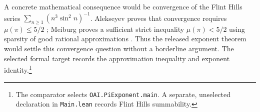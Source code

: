 A concrete mathematical consequence would be convergence of the Flint Hills
series $\sum_{n\geq1}(n^3\sin^2 n)^{-1}$. Alekseyev proves that convergence
requires $\mu(\pi)\leq5/2$ \cite{arithAlekseyev2011}; Meiburg proves a
sufficient strict inequality $\mu(\pi)<5/2$ using sparsity of good rational
approximations \cite{arithMeiburg2022}. Thus the released exponent theorem
would settle this convergence question without a borderline argument. The
selected formal target records the approximation inequality and
exponent identity.\footnote{The comparator selects
\texttt{OAI.PiExponent.main}. A separate, unselected declaration in
\texttt{Main.lean} records Flint Hills summability.}
